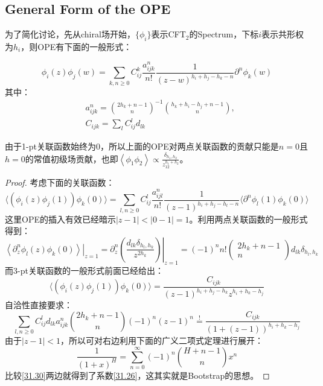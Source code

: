 \subsection{General Form of the OPE}
为了简化讨论，先从chiral场开始，$\{\phi_i\}$表示CFT$_2$的Spectrum，下标$i$表示共形权为$h_i$，则OPE有下面的一般形式：
\begin{theorem}
	\begin{equation}
		\boxed{
		\phi_i(z)\phi_j(w)=\sum_{k,n\geq0}C_{ij}^k\frac{a_{ijk}^n}{n!}\frac{1}{(z-w)^{h_i+h_j-h_k-n}}\partial^n\phi_k(w)
		}
	\end{equation}
	其中：
	\begin{equation}\label{31.26}
		\begin{aligned}
			&a_{ijk}^{n} =\binom{2h_k+n-1}n^{-1}\binom{h_k+h_i-h_j+n-1}n,  \\
			&C_{ijk} =\sum_l{C_{ij}^{l}d_{lk}}
		\end{aligned}
	\end{equation}
\end{theorem}
由于1-pt关联函数始终为0，所以上面的OPE对两点关联函数的贡献只能是$n=0$且$h=0$的常值初级场贡献，也即$\left\langle\phi_1\phi_2\right\rangle\propto\frac{\delta_{h_1,h_2}}{z_{12}^{h_1+h_2}}$。
\begin{proof}
	考虑下面的关联函数：
	\begin{equation}
		\Big\langle\left(\phi_i(z)\phi_j(1)\right)\phi_k(0)\Big\rangle=\sum_{l,n\geq0}C_{ij}^l\frac{a_{ijl}^n}{n!}\frac{1}{(z-1)^{h_i+h_j-h_l-n}}\Big\langle\partial^n\phi_l(1)\phi_k(0)\Big\rangle 
	\end{equation}
	这里OPE的插入有效已经暗示$|z-1|<|0-1|=1$。利用两点关联函数的一般形式得到：
	\begin{equation}
		\left.\left\langle\partial_{z}^{n}\phi_{l}(z)\phi_{k}(0)\right\rangle\right|_{z=1}=\partial_{z}^{n}\left.\left(\frac{d_{lk}\delta_{h_{l},h_{k}}}{z^{2h_{k}}}\right)\right|_{z=1}=(-1)^{n}n!\left(\begin{matrix}2h_{k}+n-1\\n\end{matrix}\right)d_{lk}\delta_{h_{l},h_{k}}
	\end{equation}
	而3-pt关联函数的一般形式前面已经给出：
	\begin{equation}
			\Big\langle\left(\phi_i(z)\phi_j(1)\right)\phi_k(0)\Big\rangle=\frac{C_{ijk}}{(z-1)^{h_i+h_j-h_k}z^{h_i+h_k-h_j}}
	\end{equation}
	自洽性直接要求：
	\begin{equation}\label{31.30}
		\sum\limits_{l,n\geq0}C_{ij}^ld_{lk}a_{ijk}^n\binom{2h_k+n-1}{n}(-1)^n(z-1)^n\overset{!}{=}\frac{C_{ijk}}{\left(1+(z-1)\right)^{h_i+h_k-h_j}}
	\end{equation}
	由于$|z-1|<1$，所以可对右边利用下面的广义二项式定理进行展开：
	\begin{equation}
		\frac1{(1+x)^H}=\sum_{n=0}^\infty(-1)^n\binom{H+n-1}nx^n
	\end{equation}
	比较\ref{31.30}两边就得到了系数\ref{31.26}，这其实就是Bootstrap的思想。
\end{proof}
